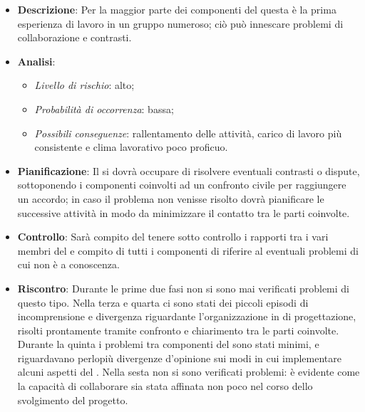 			\begin{itemize}
				\item \textbf{Descrizione}: Per la maggior parte dei componenti del  questa è la prima esperienza di lavoro in un gruppo numeroso; ciò può  innescare problemi di collaborazione e contrasti.
				\item \textbf{Analisi}:
				\begin{itemize}
					\item \textit{Livello di rischio}: alto;
					\item \textit{Probabilità di occorrenza}: bassa;
					\item \textit{Possibili conseguenze}: rallentamento delle attività, carico di lavoro più consistente e clima lavorativo poco proficuo.
				\end{itemize}
				\item \textbf{Pianificazione}: Il  si dovrà occupare di risolvere eventuali contrasti o dispute, sottoponendo i componenti coinvolti ad un confronto civile per raggiungere un accordo; in caso il problema non venisse risolto dovrà pianificare le successive attività in modo da minimizzare il contatto tra le parti coinvolte.
				\item \textbf{Controllo}: Sarà compito del  tenere sotto controllo i rapporti tra i vari membri del  e compito di tutti i componenti di riferire al  eventuali problemi di cui non è a conoscenza.
				\item \textbf{Riscontro}: Durante le prime due fasi non si sono mai verificati problemi di questo tipo. Nella terza e quarta  ci sono stati dei piccoli episodi di incomprensione e divergenza riguardante l’organizzazione in  di progettazione, risolti prontamente tramite confronto e chiarimento tra le parti coinvolte. Durante la quinta  i problemi tra componenti del  sono stati minimi, e riguardavano perlopiù divergenze d'opinione sui modi in cui implementare alcuni aspetti del . Nella sesta  non si sono verificati problemi: è evidente come la capacità di collaborare sia stata affinata non poco nel corso dello svolgimento del progetto.
			\end{itemize}
